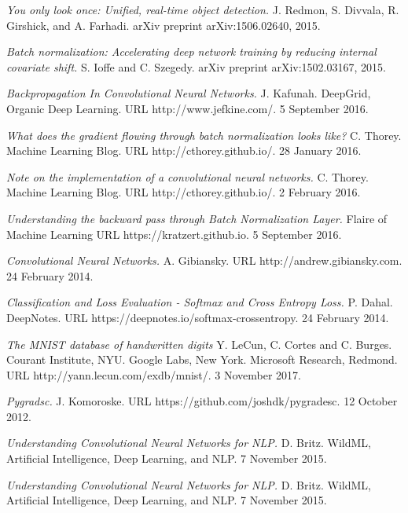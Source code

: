 \documentclass[a4paper,11pt,twoside]{article}
\begin{document}
\begin{thebibliography}{99}
	\textit{You only look once: Unified, real-time object detection.}
    J. Redmon, S. Divvala, R. Girshick, and A. Farhadi. 
    arXiv preprint arXiv:1506.02640, 2015.
    
	\textit{Batch normalization: Accelerating deep network training by reducing internal covariate shift.}
    S. Ioffe and C. Szegedy. 
	arXiv preprint arXiv:1502.03167, 2015.
    
	\textit{Backpropagation In Convolutional Neural Networks.}
	J. Kafunah.
    DeepGrid, Organic Deep Learning. 
    URL http://www.jefkine.com/.
	5 September 2016.

	\textit{What does the gradient flowing through batch normalization looks like?}
	C. Thorey.
    Machine Learning Blog. 
    URL http://cthorey.github.io/.
	28 January 2016.
	
	\textit{Note on the implementation of a convolutional neural networks.}
	C. Thorey.
    Machine Learning Blog. 
    URL http://cthorey.github.io/.
	2 February 2016.
	
	\textit{Understanding the backward pass through Batch Normalization Layer.}
	Flaire of Machine Learning
    URL https://kratzert.github.io.
	5 September 2016.
	
	\textit{Convolutional Neural Networks.}
	A. Gibiansky.
    URL http://andrew.gibiansky.com.
	24 February 2014.
	
	\textit{Classification and Loss Evaluation - Softmax and Cross Entropy Loss.}
	P. Dahal. 
	DeepNotes.
    URL https://deepnotes.io/softmax-crossentropy.
	24 February 2014.
	
	\textit{The MNIST database of handwritten digits}
	Y. LeCun, C. Cortes and C. Burges. Courant Institute, NYU. Google Labs, New York. Microsoft Research, Redmond. 
	URL http://yann.lecun.com/exdb/mnist/.
	3 November 2017.
	
	\textit{Pygradsc.}
	J. Komoroske.
	URL https://github.com/joshdk/pygradesc.
	12 October 2012.
	
	\textit{Understanding Convolutional Neural Networks for NLP.}
	D. Britz.
	WildML, Artificial Intelligence, Deep Learning, and NLP.
	7 November 2015.
	
	\textit{Understanding Convolutional Neural Networks for NLP.}
	D. Britz.
	WildML, Artificial Intelligence, Deep Learning, and NLP.
	7 November 2015.
	

\end{thebibliography}
\end{document}
